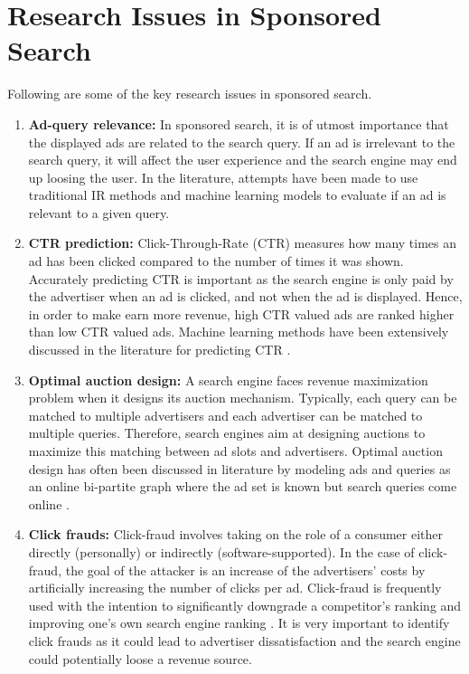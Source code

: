 \section{Research Issues in Sponsored Search}
Following are some of the key research issues in sponsored search.
\begin{enumerate}[label=(\roman*).]
    \item {\textbf{Ad-query relevance:}} In sponsored search, it is of utmost importance that the displayed ads are related to the search query. If an ad is irrelevant to the search query, it will affect the user experience and the search engine may end up loosing the user. In the literature, attempts have been made to use traditional IR methods \cite{raghavan2008evaluating} and machine learning models \cite{hillard2010improving} to evaluate if an ad is relevant to a given query.
    
    \item{\textbf{CTR prediction:}}
    Click-Through-Rate (CTR) measures how many times an ad has been clicked compared to the number of times it was shown. Accurately predicting CTR is important as the search engine is only paid by the advertiser when an ad is clicked, and not when the ad is displayed. Hence, in order to make earn more revenue, high CTR valued ads are ranked higher than low CTR valued ads. Machine learning methods have been extensively discussed in the literature for predicting CTR \cite{graepel2010web,CTREstimateNewAds}.
    
    \item{\textbf{Optimal auction design:}} A search engine faces revenue maximization problem when it designs its auction mechanism. Typically, each query can be matched to multiple advertisers and each advertiser can be matched to multiple queries. Therefore, search engines aim at designing auctions to maximize this matching between ad slots and advertisers. Optimal auction design has often been discussed in literature by modeling ads and queries as an online bi-partite graph where the ad set is known but search queries come online \cite{mehta2012online, mehta2007adwords}.
       
    \item{\textbf{Click frauds:}} Click-fraud involves taking on the role of a consumer either directly (personally) or indirectly (software-supported). In the case of click-fraud, the goal of the attacker is an increase of the advertisers' costs by artificially increasing the number of clicks per ad. Click-fraud is frequently used with the intention to significantly downgrade a competitor's ranking and improving one's own search engine ranking \cite{mladenow2015online}. It is very important to identify click frauds as it could lead to advertiser dissatisfaction and the search engine could potentially loose a revenue source. 
    

\end{enumerate}
